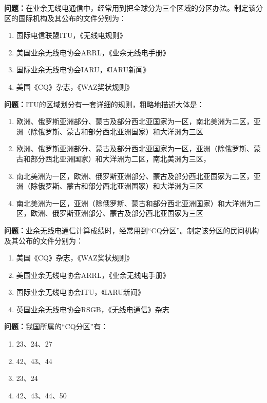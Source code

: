 \noindent\textbf{问题：}在业余无线电通信中，经常用到把全球分为三个区域的分区办法。制定该分区的国际机构及其公布的文件分别为：
\begin{enumerate}[label=\Alph*), leftmargin=3em]
\item 国际电信联盟ITU，《无线电规则》
\item 美国业余无线电协会ARRL，《业余无线电手册》
\item 国际业余无线电协会IARU，《IARU新闻》
\item 美国《CQ》杂志，《WAZ奖状规则》
\end{enumerate}

\bigskip


\noindent\textbf{问题：}ITU的区域划分有一套详细的规则，粗略地描述大体是：
\begin{enumerate}[label=\Alph*), leftmargin=3em]
\item 欧洲、俄罗斯亚洲部分、蒙古及部分西北亚国家为一区，南北美洲为二区，亚洲（除俄罗斯、蒙古和部分西北亚洲国家）和大洋洲为三区
\item 欧洲、俄罗斯亚洲部分、蒙古及部分西北亚国家为一区，亚洲（除俄罗斯、蒙古和部分西北亚洲国家）和大洋洲为二区，南北美洲为三区，
\item 南北美洲为一区，欧洲、俄罗斯亚洲部分、蒙古及部分西北亚国家为二区，亚洲（除俄罗斯、蒙古和部分西北亚洲国家）和大洋洲为三区
\item 南北美洲为一区，亚洲（除俄罗斯、蒙古和部分西北亚洲国家）和大洋洲为二区，欧洲、俄罗斯亚洲部分、蒙古及部分西北亚国家为三区
\end{enumerate}

\bigskip


\noindent\textbf{问题：}业余无线电通信计算成绩时，经常用到“CQ分区”。制定该分区的民间机构及其公布的文件分别为：
\begin{enumerate}[label=\Alph*), leftmargin=3em]
\item 美国《CQ》杂志，《WAZ奖状规则》
\item 美国业余无线电协会ARRL，《业余无线电手册》
\item 国际业余无线电协会ITU，《IARU新闻》
\item 英国业余无线电协会RSGB，《无线电通信》杂志
\end{enumerate}

\bigskip


\noindent\textbf{问题：}我国所属的“CQ分区”有：
\begin{enumerate}[label=\Alph*), leftmargin=3em]
\item 23、24、27
\item 42、43、44
\item 23、24
\item 42、43、44、50
\end{enumerate}

